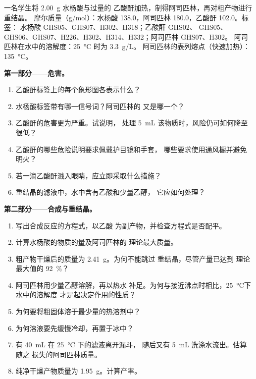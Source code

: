 \begin{problem}
\label{pb:b1:lab-techniques-1:1}
一名学生将 \qty{2.00}{g} 水杨酸与过量的
乙酸酐加热，制得阿司匹林，再对粗产物进行重结晶。
摩尔质量（\unit{g/mol}）：水杨酸  138.0，阿司匹林
 180.0，乙酸酐  102.0。标签：
水杨酸 GHS05、GHS07、H302、H318；乙酸酐 GHS02、
GHS05、GHS06、GHS07、H226、H302、H314、H332；阿司匹林 GHS07、H302。
阿司匹林在水中的溶解度：\qty{25}{\celsius} 时为 \qty{3.3}{g/L}。
阿司匹林的表列熔点（快速加热）：\qty{135}{\celsius}。

\medskip
\noindent\textbf{第一部分——危害。}
\begin{enumerate}
  \item 乙酸酐标签上的每个象形图各表示什么？
  \item 水杨酸标签带有哪一信号词？阿司匹林的
        又是哪一个？
  \item 乙酸酐的危害更为严重。试说明，
        处理 \qty{5}{mL} 该物质时，风险仍可如何降至很低？
  \item 乙酸酐的哪些危险说明要求佩戴护目镜和手套，
        哪些要求使用通风橱并避免明火？
  \item 若一滴乙酸酐溅入眼睛，应立即采取什么措施？
  \item 重结晶的滤液中，水中含有乙酸和少量乙醇，
        它应如何处理？
\end{enumerate}

\noindent\textbf{第二部分——合成与重结晶。}
\begin{enumerate}[resume]
  \item 写出合成反应的方程式，以乙酸
         为副产物，并检查方程式是否配平。
  \item 计算水杨酸的物质的量及阿司匹林的
        理论最大质量。
  \item 粗产物干燥后的质量为 \qty{2.41}{g}。为何不能跳过
        重结晶，尽管产量已达到
        理论最大值的 \qty{92}{\percent}？
  \item 阿司匹林用少量乙醇溶解，再以热水
        补足。为何与接近沸点时相比，\qty{25}{\celsius}下水中的溶解度
        才是起决定作用的性质？
  \item 为何要将粗固体溶于最少量的热溶剂中？
  \item 为何溶液要先缓慢冷却，再置于冰中？
  \item 有 \qty{40}{mL} 在 \qty{25}{\celsius} 下的滤液离开漏斗，
        随后又有 \qty{5}{mL} 洗涤水流出。估算随之
        损失的阿司匹林质量。
  \item 纯净干燥产物质量为 \qty{1.95}{g}。计算产率。
\end{enumerate}


\end{problem}
